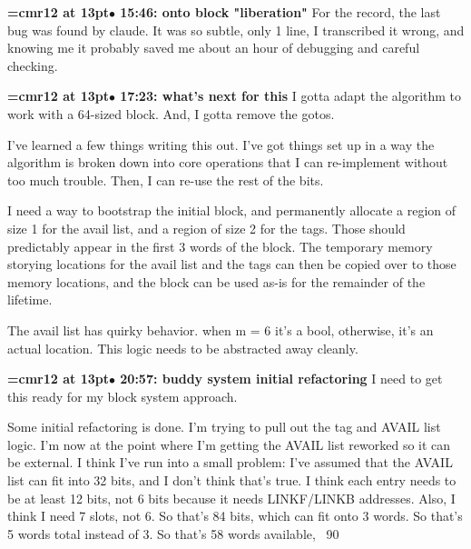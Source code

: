{\smallskip\noindent\bf\font\titlefont=cmr12 at 13pt\titlefont $\bullet$ 15:46: onto block "liberation"}\smallskip
For the record, the last bug was found by claude. It was so subtle, only 1 line, I transcribed it wrong, and knowing me it probably saved me about an hour of debugging and careful checking.
\par

{\smallskip\noindent\bf\font\titlefont=cmr12 at 13pt\titlefont $\bullet$ 17:23: what's next for this}\smallskip
I gotta adapt the algorithm to work with a 64-sized block. And, I gotta remove the gotos.
\par

I've learned a few things writing this out. I've got things set up in a way the algorithm is broken down into core operations that I can re-implement without too much trouble. Then, I can re-use the rest of the bits.
\par

I need a way to bootstrap the initial block, and permanently allocate a region of size 1 for the avail list, and a region of size 2 for the tags. Those should predictably appear in the first 3 words of the block. The temporary memory storying locations for the avail list and the tags can then be copied over to those memory locations, and the block can be used as-is for the remainder of the lifetime.
\par

The avail list has quirky behavior. when m = 6 it's a bool, otherwise, it's an actual location. This logic needs to be abstracted away cleanly.
\par

{\smallskip\noindent\bf\font\titlefont=cmr12 at 13pt\titlefont $\bullet$ 20:57: buddy system initial refactoring}\smallskip
I need to get this ready for my block system approach.
\par

Some initial refactoring is done. I'm trying to pull out the tag and AVAIL list logic. I'm now at the point where I'm getting the AVAIL list reworked so it can be external. I think I've run into a small problem: I've assumed that the AVAIL list can fit into 32 bits, and I don't think that's true. I think each entry needs to be at least 12 bits, not 6 bits because it needs LINKF/LINKB addresses. Also, I think I need 7 slots, not 6. So that's 84 bits, which can fit onto 3 words. So that's 5 words total instead of 3. So that's 58 words available, ~90%
\par

